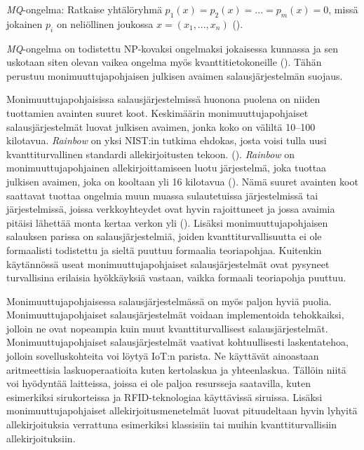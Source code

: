 \emph{MQ}-ongelma: Ratkaise yhtälöryhmä $p_{1}(x) = p_{2}(x) = ... = p_ {m}(x) = 0$, missä jokainen $p_{i}$ on neliöllinen joukossa $x = (x_{1}, ..., x_{n})$ (\cite{Ding2009}).

\emph{MQ}-ongelma on todistettu NP-kovaksi ongelmaksi jokaisessa kunnassa ja sen uskotaan siten olevan vaikea ongelma myös kvanttitietokoneille (\cite{8012305}). Tähän perustuu monimuuttujapohjaisen julkisen avaimen salausjärjestelmän suojaus.

Monimuuttujapohjaisissa salausjärjestelmissä huonona puolena on niiden tuottamien avainten suuret koot. Keskimäärin monimuuttujapohjaiset salausjärjestelmät luovat julkisen avaimen, jonka koko on väliltä 10--100 kilotavua. \emph{Rainbow} on yksi NIST:in tutkima ehdokas, josta voisi tulla uusi kvanttiturvallinen standardi allekirjoitusten tekoon. (\cite{alagic2020status}). \emph{Rainbow} on monimuuttujapohjainen allekirjoittamiseen luotu järjestelmä, joka tuottaa julkisen avaimen, joka on kooltaan yli 16 kilotavua (\cite{Ding2009}). Nämä suuret avainten koot saattavat tuottaa ongelmia muun muassa sulautetuissa järjestelmissä tai järjestelmissä, joissa verkkoyhteydet ovat hyvin rajoittuneet ja jossa avaimia pitäisi lähettää monta kertaa verkon yli (\cite{8012305}). Lisäksi monimuuttujapohjaisen salauksen parissa on salausjärjestelmiä, joiden kvanttiturvallisuutta ei ole formaalisti todistettu ja sieltä puuttuu formaalia teoriapohjaa. Kuitenkin käytännössä useat monimuuttujapohjaiset salausjärjestelmät ovat pysyneet turvallisina erilaisia hyökkäyksiä vastaan, vaikka formaali teoriapohja puuttuu.

Monimuuttujapohjaisessa salausjärjestelmässä on myös paljon hyviä puolia. Monimuuttujapohjaiset salausjärjestelmät voidaan implementoida tehokkaiksi, jolloin ne ovat nopeampia kuin muut kvanttiturvallisest salausjärjestelmät. Monimuuttujapohjaiset salausjärjestelmät vaativat kohtuullisesti laskentatehoa, jolloin sovelluskohteita voi löytyä IoT:n parista. Ne käyttävät ainoastaan aritmeettisia laskuoperaatioita kuten kertolaskua ja yhteenlaskua. Tällöin niitä voi hyödyntää laitteissa, joissa ei ole paljoa resursseja saatavilla, kuten esimerkiksi sirukorteissa ja RFID-teknologiaa käyttävissä siruissa. Lisäksi monimuuttujapohjaiset allekirjoitusmenetelmät luovat pituudeltaan hyvin lyhyitä allekirjoituksia verrattuna esimerkiksi klassisiin tai muihin kvanttiturvallisiin allekirjoituksiin.
